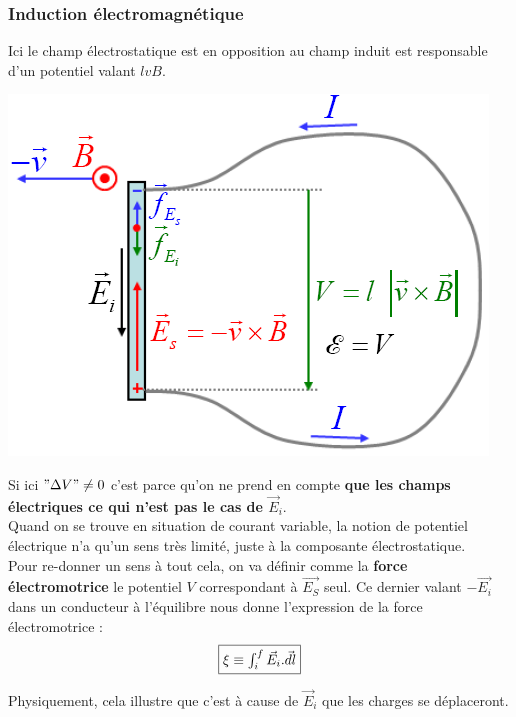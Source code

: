 \documentclass	[11pt, a4paper, openany]{book}
\begin{document}
\subsubsection*{Induction électromagnétique}
Ici le champ électrostatique est en opposition au champ induit est responsable d'un potentiel valant $lvB$. 
\begin{center}
\includegraphics[scale=0.45]{em/image6.png}\\
\end{center}
Si ici $"\Delta V" \neq 0$ c'est parce qu'on ne prend en compte \textbf{que les champs électriques ce qui n'est pas le cas de $\vec{E}_i$}.\\
Quand on se trouve en situation de courant variable, la notion de potentiel électrique n'a qu'un sens très limité, juste à la composante électrostatique.\\
Pour re-donner un sens à tout cela, on va définir comme la \textbf{force électromotrice} le potentiel $V$ correspondant à $\vec{E_S}$ seul. Ce dernier valant $-\vec{E_i}$ dans un conducteur à l'équilibre nous donne l'expression de la force électromotrice :
\begin{equation}
\fbox{$ \xi \equiv \int_i^f \vec{E}_i.\vec{dl}$}
\end{equation}

Physiquement, cela illustre que c'est à cause de $\vec{E}_i$ que les charges se déplaceront.
\end{document}

